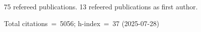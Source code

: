 75 refereed publications. 13 refeered publications as first author.

Total citations~=~5056; h-index~=~37 (2025-07-28)